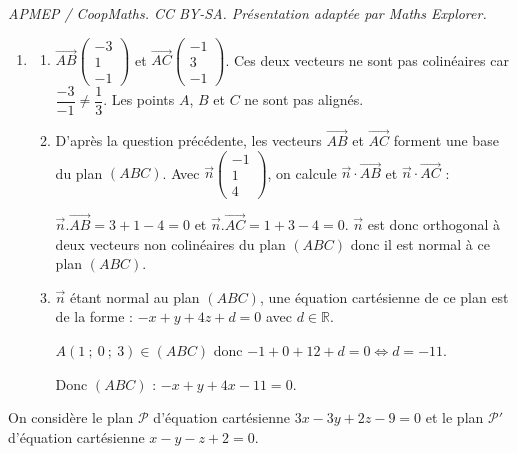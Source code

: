 \documentclass[10pt]{article}
\providecommand{\R}{\mathbb{R}}
\providecommand{\vect}[1]{\overrightarrow{#1}}
\begin{document}
\noindent\textit{APMEP / CoopMaths. CC BY-SA. Présentation adaptée par Maths Explorer.}\par\medskip
\begin{enumerate}
\item 
	\begin{enumerate}
	\item $\vect{AB}\begin{pmatrix}-3\\1\\-1\end{pmatrix}$ et $\vect{AC}\begin{pmatrix}-1\\3\\-1\end{pmatrix}$. Ces deux vecteurs ne sont pas colinéaires car $\dfrac{-3}{-1}\neq \dfrac{1}{3}$. Les points $A$, $B$ et $C$ ne sont pas alignés.
	\item D'après la question précédente, les vecteurs $\vect{AB}$ et $\vect{AC}$ forment une base du plan $(ABC)$.
	Avec $\vect{n}\begin{pmatrix}-1\\1\\4\end{pmatrix}$, on calcule $\vect{n}\cdot\vect{AB}$ et $\vect{n}\cdot\vect{AC}$ :
	
	$\vect{n}.\vect{AB}=3+1-4=0$ et $\vect{n}.\vect{AC}=1+3-4=0$. $\vect{n}$ est donc orthogonal à deux vecteurs non colinéaires du plan $(ABC)$ donc il est normal à ce plan $(ABC)$.
	\item $\vect{n}$ étant normal au plan $(ABC)$, une équation cartésienne de ce plan est de la forme : $-x+y+4z+d=0$ avec $d \in \R$.

$A(1~;~0~;~3) \in (ABC)$ donc $-1+0+12+d=0 \iff d=-11$.

Donc $(ABC)$ : $-x+y+4x-11=0$.
	\end{enumerate}
\end{enumerate}

On considère le plan $\mathcal{P}$ d'équation cartésienne $3x - 3y + 2z - 9 = 0$ et le plan $\mathcal{P}'$ d'équation cartésienne $x - y- z + 2 = 0$.
\end{document}
